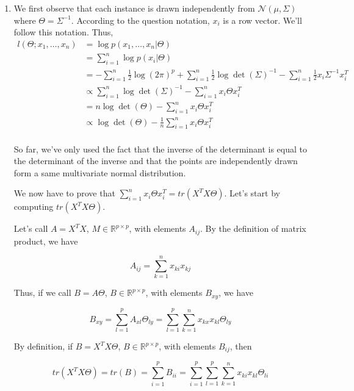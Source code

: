 \documentclass{article}
\begin{document}
\begin{enumerate}

\item
We first observe that each instance is drawn independently from $\mathcal{N}(\mu,\Sigma)$ where $\Theta = \Sigma^{-1}$.
According to the question notation, $x_i$ is a row vector. We'll follow this notation.
Thus,
\begin{equation*}
\begin{split}
l(\Theta;x_1,\dots,x_n) &= \log p(x_1,\dots,x_n|\Theta)\\
&= \sum_{i=1}^{n} \log p(x_i |\Theta)\\
&= - \sum_{i=1}^{n} \frac{1}{2}\log(2\pi)^p + \sum_{i=1}^{n}\frac{1}{2}\log \det(\Sigma)^{-1} - \sum_{i=1}^{n}\frac{1}{2}x_i\Sigma^{-1} x_i^T\\
&\propto \sum_{i=1}^{n}\log \det(\Sigma)^{-1} - \sum_{i=1}^{n}x_i\Theta x_i^T\\
&= n\log \det(\Theta) - \sum_{i=1}^{n}x_i\Theta x_i^T\\
&\propto \log \det(\Theta) - \frac{1}{n}\sum_{i=1}^{n}x_i\Theta x_i^T\\
\end{split}
\end{equation*}

So far, we've only used the fact that the inverse of the determinant is equal to the determinant of the inverse and that the points are independently drawn form a same multivariate normal distribution.

We now have to prove that $\sum_{i=1}^{n}x_i\Theta x_i^T = tr(X^TX\Theta)$. Let's start by computing $tr(X^TX\Theta)$.

Let's call $A = X^TX$, $M\in\mathbb{R}^{p\times p}$, with elements $A_{ij}$. By the definition of matrix product, we have

\begin{equation*}
A_{ij} = \sum_{k=1}^n x_{ki}x_{kj}
\end{equation*}

Thus, if we call $B = A\Theta$, $B\in\mathbb{R}^{p\times p}$, with elements $B_{xy}$, we have

\begin{equation*}
B_{xy} = \sum_{l=1}^p A_{xl}\Theta_{ly} = \sum_{l=1}^p\sum_{k=1}^n x_{kx}x_{kl}\Theta_{ly}
\end{equation*}


By definition, if $B = X^TX\Theta$, $B\in\mathbb{R}^{p\times p}$, with elements $B_{ij}$, then

\begin{equation*}
tr(X^TX\Theta) = tr(B) = \sum_{i=1}^p B_{ii} = \sum_{i=1}^p\sum_{l=1}^p\sum_{k=1}^n x_{ki}x_{kl}\Theta_{li}
\end{equation*}


\end{enumerate}
\end{document}
